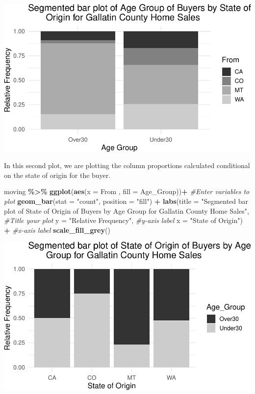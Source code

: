 \documentclass[
]{report}
\newenvironment{Shaded}{\begin{snugshade}}{\end{snugshade}}
\newcommand{\AttributeTok}[1]{\textcolor[rgb]{0.13,0.29,0.53}{#1}}
\newcommand{\CommentTok}[1]{\textcolor[rgb]{0.56,0.35,0.01}{\textit{#1}}}
\newcommand{\FunctionTok}[1]{\textcolor[rgb]{0.13,0.29,0.53}{\textbf{#1}}}
\newcommand{\NormalTok}[1]{#1}
\newcommand{\SpecialCharTok}[1]{\textcolor[rgb]{0.81,0.36,0.00}{\textbf{#1}}}
\newcommand{\StringTok}[1]{\textcolor[rgb]{0.31,0.60,0.02}{#1}}
\begin{document}
\begin{center}\includegraphics[width=0.55\linewidth]{08-VN08-two-cat-simulation_files/figure-latex/unnamed-chunk-4-1} \end{center}

In this second plot, we are plotting the column proportions calculated conditional on the state of origin for the buyer.

\begin{Shaded}
\begin{Highlighting}[]
\NormalTok{moving }\SpecialCharTok{\%\textgreater{}\%}
  \FunctionTok{ggplot}\NormalTok{(}\FunctionTok{aes}\NormalTok{(}\AttributeTok{x =}\NormalTok{ From , }\AttributeTok{fill =}\NormalTok{ Age\_Group))}\SpecialCharTok{+} \CommentTok{\#Enter variables to plot}
  \FunctionTok{geom\_bar}\NormalTok{(}\AttributeTok{stat =} \StringTok{"count"}\NormalTok{, }\AttributeTok{position =} \StringTok{"fill"}\NormalTok{) }\SpecialCharTok{+}
  \FunctionTok{labs}\NormalTok{(}\AttributeTok{title =} \StringTok{"Segmented bar plot of State of Origin of Buyers by Age}
\StringTok{       Group for Gallatin County Home Sales"}\NormalTok{,}
       \CommentTok{\#Title your plot}
       \AttributeTok{y =} \StringTok{"Relative Frequency"}\NormalTok{, }\CommentTok{\#y{-}axis label}
       \AttributeTok{x =} \StringTok{"State of Origin"}\NormalTok{) }\SpecialCharTok{+} \CommentTok{\#x{-}axis label}
  \FunctionTok{scale\_fill\_grey}\NormalTok{()}
\end{Highlighting}
\end{Shaded}

\begin{center}\includegraphics[width=0.55\linewidth]{08-VN08-two-cat-simulation_files/figure-latex/unnamed-chunk-5-1} \end{center}
\end{document}
